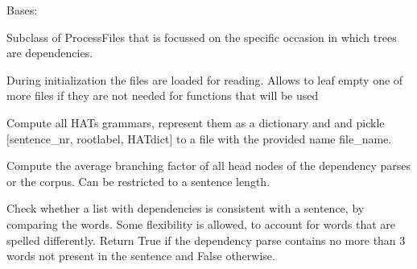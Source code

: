 \documentclass[letterpaper,10pt,english]{sphinxmanual}
\begin{document}
\begin{fulllineitems}
\label{file_processing:file_processing.ProcessDependencies}
Bases: {\hyperref[file_processing:file_processing.ProcessFiles]{}}

Subclass of ProcessFiles that is focussed on the specific
occasion in which trees are dependencies.

During initialization the files are loaded for reading. Allows to leaf empty
one of more files if they are not needed for functions that will be used

\begin{fulllineitems}
\label{file_processing:file_processing.ProcessDependencies.all_HATs}
Compute all HATs grammars, represent them as a dictionary and
and pickle {[}sentence\_nr, rootlabel, HATdict{]} to a file with 
the     provided name file\_name.

\end{fulllineitems}


\begin{fulllineitems}
\label{file_processing:file_processing.ProcessDependencies.branching_factor}
Compute the average branching factor of all head nodes
of the dependency parses or the corpus.
Can be restricted to a sentence length.

\end{fulllineitems}


\begin{fulllineitems}
\label{file_processing:file_processing.ProcessDependencies.check_consistency}
Check whether a list with dependencies is
consistent with a sentence, by comparing the words.
Some flexibility is allowed, to account for words
that are spelled differently. Return True if the
dependency parse contains no more than 3 words not
present in the sentence and False otherwise.


\end{fulllineitems}
\end{fulllineitems}
\end{document}
